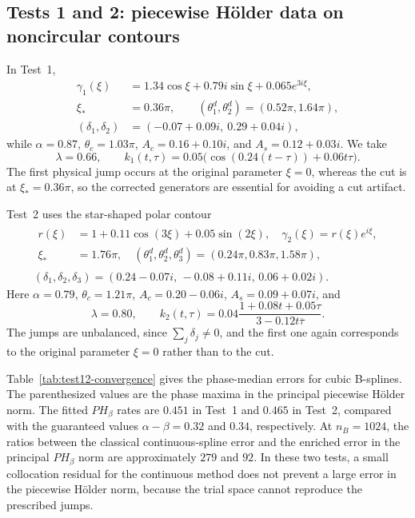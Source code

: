 \documentclass[11pt,a4paper]{amsart}
\theoremstyle{plain}
\theoremstyle{definition}
\theoremstyle{remark}
\begin{document}
\subsection{Tests 1 and 2: piecewise H\"older data on noncircular contours}

In Test~1,
\begin{align*}
 \gamma_1(\xi)
 &=1.34\cos\xi+0.79i\sin\xi+0.065e^{3i\xi},\\
 \xi_*&=0.36\pi,
 \qquad
 (\theta_1^d,\theta_2^d)=(0.52\pi,1.64\pi),\\
 (\delta_1,\delta_2)
 &=(-0.07+0.09i,\ 0.29+0.04i),
\end{align*}
while $\alpha=0.87$, $\theta_c=1.03\pi$,
$A_c=0.16+0.10i$, and $A_s=0.12+0.03i$.  We take
\[
 \lambda=0.66,
 \qquad
 k_1(t,\tau)=0.05\bigl(\cos(0.24(t-\tau))+0.06t\tau\bigr).
\]
The first physical jump occurs at the original parameter $\xi=0$, whereas
the cut is at $\xi_*=0.36\pi$, so the corrected generators are essential for
avoiding a cut artifact.

Test~2 uses the star-shaped polar contour
\[
\begin{gathered}
\begin{aligned}
r(\xi)&=1+0.11\cos(3\xi)+0.05\sin(2\xi),
\quad
\gamma_2(\xi)=r(\xi)e^{i\xi},\\
\xi_*&=1.76\pi,
\quad
(\theta_1^d,\theta_2^d,\theta_3^d)
=(0.24\pi,0.83\pi,1.58\pi),
\end{aligned}\\[2mm]
(\delta_1,\delta_2,\delta_3)
=(0.24-0.07i,\,-0.08+0.11i,\,0.06+0.02i).
\end{gathered}
\]
Here $\alpha=0.79$, $\theta_c=1.21\pi$,
$A_c=0.20-0.06i$, $A_s=0.09+0.07i$, and
\[
 \lambda=0.80,
 \qquad
 k_2(t,\tau)
 =0.04\frac{1+0.08t+0.05\tau}{3-0.12t\overline\tau}.
\]
The jumps are unbalanced, since $\sum_j\delta_j\ne0$, and the first one
again corresponds to the original parameter $\xi=0$ rather than to the cut.

Table~\ref{tab:test12-convergence} gives the phase-median errors for cubic
B-splines.  The parenthesized values are the phase maxima in the principal
piecewise H\"older norm.  The fitted $PH_\beta$ rates are $0.451$ in Test~1
and $0.465$ in Test~2, compared with the guaranteed values
$\alpha-\beta=0.32$ and $0.34$, respectively.  At $n_B=1024$, the ratios
between the classical continuous-spline error and the enriched error in the
principal $PH_\beta$ norm are approximately $279$ and $92$.  In these two tests, a small collocation residual for the continuous method does not prevent a large error in the piecewise H\"older norm, because the trial space cannot reproduce the prescribed jumps.
\end{document}
